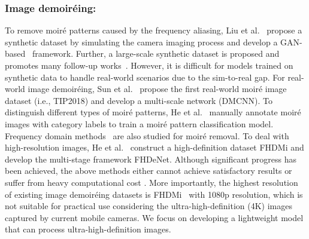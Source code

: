 \documentclass[runningheads]{llncs}
\newcommand{\etal}{et al.}
\newcommand{\ie}{i.e.}
\begin{document}
\subsubsection{Image demoiréing:} To remove moiré patterns caused by the frequency aliasing,  
Liu \etal~\cite{liu2018demoir} propose a synthetic dataset by simulating the camera imaging process and develop a GAN-based~\cite{goodfellow2014generative} framework. Further, a large-scale synthetic dataset \cite{yuan2019aim} is proposed and promotes many follow-up works~\cite{zheng2020image,cheng2019multi,yuan2019aim}.
However, it is difficult for models trained on synthetic data to handle real-world scenarios due to the sim-to-real gap. 
For real-world image demoiréing, Sun \etal~\cite{sun2018moire} propose the first real-world moiré image dataset (\ie, TIP2018) and develop a multi-scale network (DMCNN).
To distinguish different types of moiré patterns, He \etal~\cite{he2019mop} manually annotate moiré images with category labels to train a moiré pattern classification model. 
Frequency domain methods~\cite{liu2020wavelet,zheng2020image} are also studied for moiré removal. 
To deal with high-resolution images, He \etal~\cite{he2020fhde} construct a high-definition dataset FHDMi and develop the multi-stage framework FHDeNet. 
Although significant progress has been achieved, the above methods either cannot achieve satisfactory results \cite{zheng2020image,he2019mop,sun2018moire,cheng2019multi} or suffer from heavy computational cost \cite{zheng2020image,he2020fhde,he2019mop,cheng2019multi}. More importantly, the highest resolution of existing image demoiréing datasets is FHDMi~\cite{he2020fhde} with 1080p resolution, which is not suitable for practical use considering the ultra-high-definition (4K) images captured by current mobile cameras. We focus on developing a lightweight model that can process ultra-high-definition images.
 
  
\end{document}
